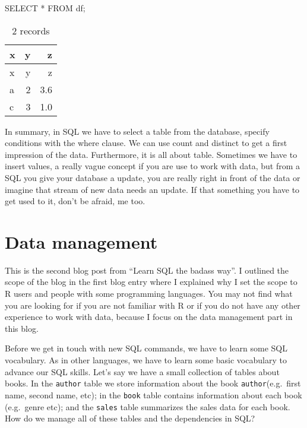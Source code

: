 \documentclass[
  letterpaper,
  DIV=11,
  numbers=noendperiod]{scrreprt}
\newenvironment{Shaded}{\begin{snugshade}}{\end{snugshade}}
\newcommand{\KeywordTok}[1]{\textcolor[rgb]{0.00,0.23,0.31}{#1}}
\newcommand{\NormalTok}[1]{\textcolor[rgb]{0.00,0.23,0.31}{#1}}
\newcommand{\OperatorTok}[1]{\textcolor[rgb]{0.37,0.37,0.37}{#1}}
\begin{document}
\begin{Shaded}
\begin{Highlighting}[]
\KeywordTok{SELECT} \OperatorTok{*} \KeywordTok{FROM}\NormalTok{ df;}
\end{Highlighting}
\end{Shaded}

\begin{longtable}[]{@{}lrr@{}}
\caption{2 records}\tabularnewline
\toprule()
x & y & z \\
\midrule()
\endfirsthead
\toprule()
x & y & z \\
\midrule()
\endhead
a & 2 & 3.6 \\
c & 3 & 1.0 \\
\bottomrule()
\end{longtable}

In summary, in SQL we have to select a table from the database, specify
conditions with the where clause. We can use count and distinct to get a
first impression of the data. Furthermore, it is all about table.
Sometimes we have to insert values, a really vague concept if you are
use to work with data, but from a SQL you give your database a update,
you are really right in front of the data or imagine that stream of new
data needs an update. If that something you have to get used to it,
don't be afraid, me too.


\hypertarget{data-management}{%
\chapter{Data management}\label{data-management}}

This is the second blog post from ``Learn SQL the badass way''. I
outlined the scope of the blog in the first blog entry where I explained
why I set the scope to R users and people with some programming
languages. You may not find what you are looking for if you are not
familiar with R or if you do not have any other experience to work with
data, because I focus on the data management part in this blog.

Before we get in touch with new SQL commands, we have to learn some SQL
vocabulary. As in other languages, we have to learn some basic
vocabulary to advance our SQL skills. Let's say we have a small
collection of tables about books. In the \texttt{author} table we store
information about the book \texttt{author}(e.g.~first name, second name,
etc); in the \texttt{book} table contains information about each book
(e.g.~genre etc); and the \texttt{sales} table summarizes the sales data
for each book. How do we manage all of these tables and the dependencies
in SQL?
\end{document}
